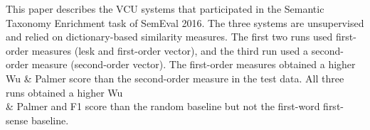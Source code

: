 This paper describes the VCU systems that participated in the Semantic Taxonomy Enrichment task of SemEval 2016. The three systems are unsupervised and relied on dictionary-based similarity measures. The first two runs used first-order measures (lesk and first-order vector), and the third run used a second-order measure (second-order vector). The first-order measures obtained a higher Wu \& Palmer score than the second-order measure in the test data. All three runs obtained a higher Wu \\& Palmer and F1 score than the random baseline but not the first-word first-sense baseline.
